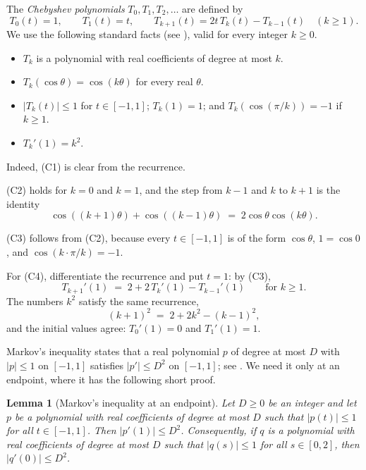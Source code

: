 \documentclass[11pt,reqno]{amsart}
\newtheorem{lemma}[theorem]{Lemma}
\theoremstyle{definition}
\theoremstyle{remark}
\numberwithin{equation}{section}
\theoremstyle{named}
\theoremstyle{plain}
\newcommand{\abs}[1]{\lvert #1\rvert}
\begin{document}
The \emph{Chebyshev polynomials} $T_0,T_1,T_2,\dots$ are defined by
\[
   T_0(t)=1,\qquad T_1(t)=t,\qquad T_{k+1}(t)=2t\,T_k(t)-T_{k-1}(t)\quad(k\ge1).
\]
We use the following standard facts (see \cite{BE}), valid for every integer $k\ge0$.
\begin{itemize}
\item[(C1)] $T_k$ is a polynomial with real coefficients of degree at most $k$.
\item[(C2)] $T_k(\cos\theta)=\cos(k\theta)$ for every real $\theta$.
\item[(C3)] $\abs{T_k(t)}\le1$ for $t\in[-1,1]$; $T_k(1)=1$; and $T_k(\cos(\pi/k))=-1$ if $k\ge1$.
\item[(C4)] $T_k'(1)=k^{2}$.
\end{itemize}
Indeed, (C1) is clear from the recurrence.

(C2) holds for $k=0$ and $k=1$, and the step from $k-1$ and
$k$ to $k+1$ is the identity
\[
   \cos((k+1)\theta)+\cos((k-1)\theta)\;=\;2\cos\theta\cos(k\theta).
\]

(C3)
follows from (C2), because every $t\in[-1,1]$ is of the form $\cos\theta$, $1=\cos0$, and
$\cos(k\cdot\pi/k)=-1$.

For (C4), differentiate the recurrence and put $t=1$: by (C3),
\[
   T_{k+1}'(1)\;=\;2+2\,T_k'(1)-T_{k-1}'(1)\qquad\text{for }k\ge1.
\]
The numbers $k^{2}$ satisfy the same recurrence,
\[
   (k+1)^{2}\;=\;2+2k^{2}-(k-1)^{2},
\]
and the initial values agree: $T_0'(1)=0$ and $T_1'(1)=1$.

Markov's inequality states that a real polynomial $p$ of degree at most $D$ with $\abs{p}\le1$ on
$[-1,1]$ satisfies $\abs{p'}\le D^{2}$ on $[-1,1]$; see \cite{BE}. We need it only at an endpoint,
where it has the following short proof.

\begin{lemma}[Markov's inequality at an endpoint]\label{lem:markov}
Let $D\ge0$ be an integer and let $p$ be a polynomial with real coefficients of degree at most $D$ such
that $\abs{p(t)}\le1$ for all $t\in[-1,1]$. Then $\abs{p'(1)}\le D^{2}$. Consequently, if $q$ is a
polynomial with real coefficients of degree at most $D$ such that $\abs{q(s)}\le1$ for all
$s\in[0,2]$, then $\abs{q'(0)}\le D^{2}$.
\end{lemma}
\end{document}
